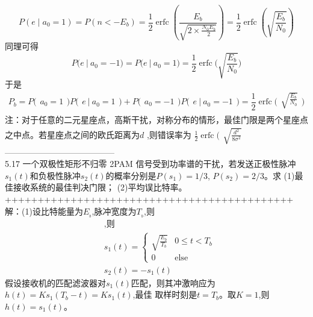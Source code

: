 \documentclass[utf8]{article}
\begin{document}
$$P\left(e\mid a_0=1\right)=P\left(n<-E_b\right)=\frac{1}{2}\operatorname{erfc}\left(\frac{E_b}{\sqrt{2\times\frac{N_0E_b}{2}}}\right)=\frac{1}{2}\operatorname{erfc}\left(\sqrt{\frac{E_b}{N_0}}\right)$$
同理可得
$$P\bigl(e\:|\:a_0=-1\bigr)=P\bigl(e\:|\:a_0=1\bigr)=\frac{1}{2}\operatorname{erfc}\biggl(\sqrt{\frac{E_b}{N_0}}\biggr)$$
于是
$$P_b=P\bigl(\begin{matrix}a_0=1\end{matrix}\bigr)P\bigl(\begin{matrix}e\:|\:a_0=1\end{matrix}\bigr)+P\bigl(\begin{matrix}a_0=-1\end{matrix}\bigr)P\bigl(\begin{matrix}e\:|\:a_0=-1\end{matrix}\bigr)=\frac{1}{2}\operatorname{erfc}\biggl(\begin{matrix}\sqrt{\frac{E_b}{N_0}}\\\end{matrix}\biggr)$$
注：对于任意的二元星座点，高斯干扰，对称分布的情形，最佳门限是两个星座点
之中点。若星座点之间的欧氏距离为$d$ ,则错误率为
$\frac{1}{2}\operatorname{erfc}\biggl(\begin{matrix}\sqrt{\frac{d^{2}}{8\sigma^{2}}}\end{matrix}$\\
---------------------------------------\\
5.17 一个双极性矩形不归零 2PAM 信号受到功率谱的干扰，若发送正极性脉冲$s_1(t)$和负极性脉冲$s_2(t)$的概率分别是$P(s_1)=1/3$, $P(s_2)=2/3。求$
(1)最佳接收系统的最佳判决门限；
(2)平均误比特率。
++++++++++++++++++++++++++++++++++++++++++++\\
解：(1)设比特能量为$E_{_b}$,脉冲宽度为$T_{_b}$,则
$$\begin{aligned}&\text{,则}\\&s_{1}\left(t\right)=\begin{cases}\sqrt{\frac{E_{b}}{T_{b}}}&0\leq t<T_{b}\\0&\mathrm{else}\end{cases}\\&s_{2}\left(t\right)=-s_{1}\left(t\right)\end{aligned}$$
假设接收机的匹配滤波器对$s_1(t)$匹配，则其冲激响应为$h(t)=Ks_1(T_b-t)=Ks_1(t)$,最佳
取样时刻是$t=T_b$。取$K=1$,则$h(t)=s_1(t)$。
\end{document}

